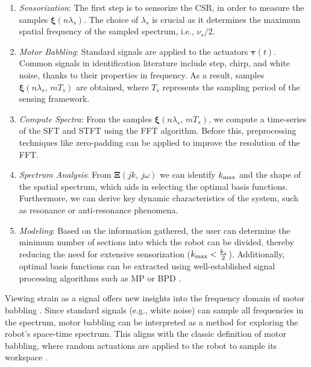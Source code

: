 \begin{enumerate}
    \item \textit{Sensorization}: The first step is to sensorize the \ac{CSR}, in order to measure the samples $\bm{\xi}(n \lambda_s)$. The choice of $\lambda_s$ is crucial as it determines the maximum spatial frequency of the sampled spectrum, i.e., $\nu_s / 2$.
    
    \item \textit{Motor Babbling}: Standard signals are applied to the actuators $\bm{\tau}(t)$. Common signals in identification literature include step, chirp, and white noise, thanks to their properties in frequency.
    As a result, samples $\bm{\xi}(n \lambda_s, \, m T_s)$ are obtained, where $T_s$ represents the sampling period of the sensing framework.

    \item \textit{Compute Spectra}: From the samples $\bm{\xi}(n \lambda_s, \, m T_s)$, we compute a time-series of the \ac{SFT} and \ac{STFT} using the \acf{FFT} algorithm. Before this, preprocessing techniques like zero-padding can be applied to improve the resolution of the \ac{FFT}.

    \item \textit{Spectrum Analysis}: From $\bm{\Xi}(jk, \, j \omega)$ we can identify $k_{\textnormal{max}}$ and the shape of the spatial spectrum, which aids in selecting the optimal basis functions. 
    Furthermore, we can derive key dynamic characteristics of the system, such as resonance or anti-resonance phenomena.
    
    \item \textit{Modeling}: 
    Based on the information gathered, the user can determine the minimum number of sections into which the robot can be divided, thereby reducing the need for extensive sensorization ($k_{\textnormal{max}} < \frac{k_s}{2}$). 
    Additionally, optimal basis functions can be extracted using well-established signal processing algorithms such as \ac{MP} \cite{mallat1993matching} or \ac{BPD} \cite{chen2001atomic}.
\end{enumerate}

Viewing strain as a signal offers new insights into the frequency domain of motor babbling \cite{george2020first}. Since standard signals (e.g., white noise) can sample all frequencies in the spectrum, motor babbling can be interpreted as a method for exploring the robot's space-time spectrum. This aligns with the classic definition of motor babbling, where random actuations are applied to the robot to sample its workspace \cite{george2020first}.



% 